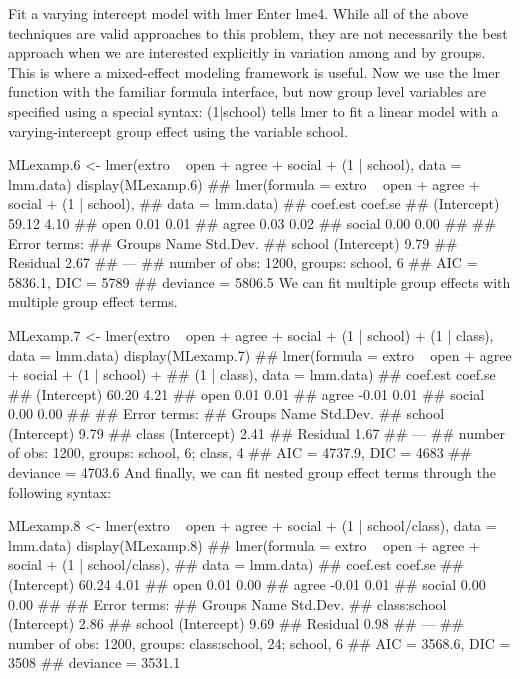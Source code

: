 Fit a varying intercept model with lmer
Enter lme4. While all of the above techniques are valid approaches to this problem, they are not necessarily the best approach when we are interested explicitly in variation among and by groups. This is where a mixed-effect modeling framework is useful. Now we use the lmer function with the familiar formula interface, but now group level variables are specified using a special syntax: (1|school) tells lmer to fit a linear model with a varying-intercept group effect using the variable school.

MLexamp.6 <- lmer(extro ~ open + agree + social + (1 | school), data = lmm.data)
display(MLexamp.6)
## lmer(formula = extro ~ open + agree + social + (1 | school), 
##     data = lmm.data)
##             coef.est coef.se
## (Intercept) 59.12     4.10  
## open         0.01     0.01  
## agree        0.03     0.02  
## social       0.00     0.00  
## 
## Error terms:
##  Groups   Name        Std.Dev.
##  school   (Intercept) 9.79    
##  Residual             2.67    
## ---
## number of obs: 1200, groups: school, 6
## AIC = 5836.1, DIC = 5789
## deviance = 5806.5
We can fit multiple group effects with multiple group effect terms.

MLexamp.7 <- lmer(extro ~ open + agree + social + (1 | school) + (1 | class), 
    data = lmm.data)
display(MLexamp.7)
## lmer(formula = extro ~ open + agree + social + (1 | school) + 
##     (1 | class), data = lmm.data)
##             coef.est coef.se
## (Intercept) 60.20     4.21  
## open         0.01     0.01  
## agree       -0.01     0.01  
## social       0.00     0.00  
## 
## Error terms:
##  Groups   Name        Std.Dev.
##  school   (Intercept) 9.79    
##  class    (Intercept) 2.41    
##  Residual             1.67    
## ---
## number of obs: 1200, groups: school, 6; class, 4
## AIC = 4737.9, DIC = 4683
## deviance = 4703.6
And finally, we can fit nested group effect terms through the following syntax:

MLexamp.8 <- lmer(extro ~ open + agree + social + (1 | school/class), data = lmm.data)
display(MLexamp.8)
## lmer(formula = extro ~ open + agree + social + (1 | school/class), 
##     data = lmm.data)
##             coef.est coef.se
## (Intercept) 60.24     4.01  
## open         0.01     0.00  
## agree       -0.01     0.01  
## social       0.00     0.00  
## 
## Error terms:
##  Groups       Name        Std.Dev.
##  class:school (Intercept) 2.86    
##  school       (Intercept) 9.69    
##  Residual                 0.98    
## ---
## number of obs: 1200, groups: class:school, 24; school, 6
## AIC = 3568.6, DIC = 3508
## deviance = 3531.1

